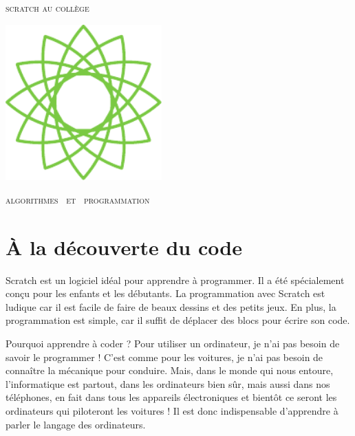 
\pagestyle{empty}\thispagestyle{empty}
\vspace*{\fill}
\begin{center}
\fontsize{52}{52}\selectfont
\textsc{scratch au collège}

  \hfil
  
  \includegraphics[width = 6cm]{logoScratchAuCollege}
\end{center}
\vfill
\begin{center}
\huge
\textsc{algorithmes \  et \  programmation}
\end{center}
\begin{center}
\end{center}
\clearemptydoublepage

\thispagestyle{empty}

\vspace*{\fill}
\vspace*{-5ex}

\section*{À la découverte du code}

\vspace*{-2ex}

Scratch est un logiciel idéal pour apprendre à programmer. Il a été spécialement conçu pour les enfants et les débutants. La programmation avec Scratch est ludique car il est facile de faire de beaux dessins et des petits jeux. En plus, la programmation est simple, car il suffit de déplacer des blocs pour écrire son code.

\smallskip 

Pourquoi apprendre à coder ? Pour utiliser un ordinateur, je n'ai pas besoin de savoir le programmer ! C'est comme pour les voitures, je n'ai pas besoin de connaître la mécanique pour conduire. Mais, dans le monde qui nous entoure, l'informatique est partout, dans les ordinateurs bien sûr, mais aussi dans nos téléphones, en fait dans tous les appareils électroniques et bientôt ce seront les ordinateurs qui piloteront les voitures ! Il est donc indispensable d'apprendre à parler le langage des ordinateurs. 

